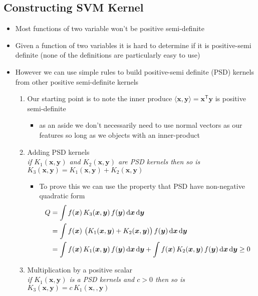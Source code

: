 \documentclass[11pt]{article}
\newcommand{\tr}{\textsf{T}}
\newcommand{\dd}{\mathrm{d}}
\begin{document}
\subsection{Constructing SVM Kernel}
\label{sec:org71ca667}
\begin{itemize}
\item Most functions of two variable won't be positive semi-definite
\item Given a function of two variables it is hard to determine if it
is positive-semi definite (none of the definitions are
particularly easy to use)
\item However we can use simple rules to build positive-semi definite (PSD)
kernels from other positive semi-definite kernels
\begin{enumerate}
\item Our starting point is to note the inner produce \(\langle \bm{x},
	\bm{y} \rangle = \bm{x}^\tr \bm{y}\) is positive semi-definite
\begin{itemize}
\item as an aside we don't necessarily need to use normal vectors as
our features so long as we objects with an inner-product
\end{itemize}
\item Adding PSD kernels\\
\emph{if \(K_1(\bm{x},\bm{y})\) and \(K_2(\bm{x}, \bm{y})\) are PSD kernels then so is \(K_3(\bm{x}, \bm{y}) = K_1(\bm{x}, \bm{y}) + K_2(\bm{x}, \bm{y})\)}
\begin{itemize}
\item To prove this we can use the property that PSD have
non-negative quadratic form
\begin{align*}
Q &= \int f(\bm{x})\, K_3(\bm{x}, \bm{y}) \, f(\bm{y})
 \, \dd \bm{x}  \, \dd \bm{y} \\
 &=\int f(\bm{x})\, \left( \strut K_1(\bm{x}, \bm{y}) + K_2(\bm{x},
 \bm{y}) \right)  f(\bm{y}) \, \dd \bm{x}  \, \dd \bm{y} \\
 &=\int f(\bm{x})\, K_1(\bm{x}, \bm{y}) \, f(\bm{y}) \, \dd \bm{x}  \, \dd \bm{y} +
 \int f(\bm{x})\, K_2(\bm{x}, \bm{y}) \, f(\bm{y}) \, \dd \bm{x}  \, \dd \bm{y}
 \geq 0
 \end{align*}
\end{itemize}
\item Multiplication by a positive scalar\\
\emph{if \(K_1(\bm{x},\bm{y})\) is a PSD kernels and \(c>0\) then so is \(K_3(\bm{x}, \bm{y}) = c\,K_1(\bm{x},,\bm{y})\)}
\begin{itemize}

\end{itemize}
\end{enumerate}
\end{itemize}
\end{document}
